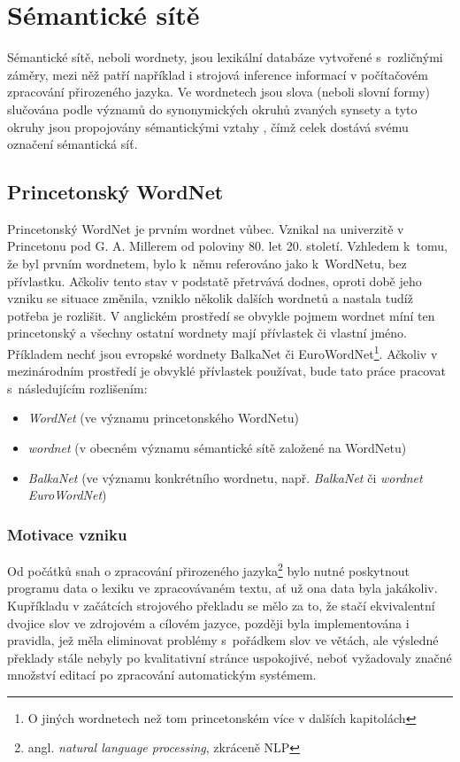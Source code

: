 \documentclass[a4paper, 11pt, oneside, showtrims]{book}
\begin{document}
	\newpage

	\part{Sémantické sítě}
	\label{part:eins}

		Sémantické sítě, neboli wordnety, jsou lexikální databáze vytvořené s~rozličnými záměry, mezi něž patří například i strojová inference informací v počítačovém zpracování přirozeného jazyka. Ve wordnetech jsou slova (neboli slovní formy) slučována podle významů do synonymických okruhů zvaných synsety a tyto okruhy jsou propojovány sémantickými vztahy \parencite{pala2013vceska, princetonWN}, čímž celek dostává svému označení sémantická síť.

		\chapter{Princetonský WordNet} %
		\label{cha:princeton_wn}
		
			Princetonský WordNet je prvním wordnet vůbec. Vznikal na univerzitě v Princetonu pod G. A. Millerem od poloviny 80. let 20. století. Vzhledem k~tomu, že byl prvním wordnetem, bylo k~němu referováno jako k~WordNetu, bez přívlastku. Ačkoliv tento stav v podstatě přetrvává dodnes, oproti době jeho vzniku se situace změnila, vzniklo několik dalších wordnetů a nastala tudíž potřeba je rozlišit. V anglickém prostředí se obvykle pojmem wordnet míní ten princetonský a všechny ostatní wordnety mají přívlastek či vlastní jméno. Příkladem nechť jsou evropské wordnety BalkaNet či EuroWordNet\footnote{O jiných wordnetech než tom princetonském více v dalších kapitolách}. Ačkoliv v mezinárodním prostředí je obvyklé přívlastek  používat, bude tato práce pracovat s~následujícím rozlišením:

			\begin{itemize}
				\item \textit{WordNet} (ve významu princetonského WordNetu)
				\item \textit{wordnet} (v obecném významu sémantické sítě založené na WordNetu)
				\item \textit{BalkaNet} (ve významu konkrétního wordnetu, např. \textit{BalkaNet} či \textit{wordnet EuroWordNet})
			\end{itemize}

			\section{Motivace vzniku}
				Od počátků snah o zpracování přirozeného jazyka\footnote{angl. \textit{natural language processing}, zkráceně NLP} bylo nutné poskytnout programu data o lexiku ve zpracovávaném textu, ať už ona data byla jakákoliv. Kupříkladu v začátcích strojového překladu se mělo za to, že stačí ekvivalentní dvojice slov ve zdrojovém a cílovém jazyce, později byla implementována i pravidla, jež měla eliminovat problémy s~pořádkem slov ve větách, ale výsledné překlady stále nebyly po kvalitativní stránce uspokojivé, neboť vyžadovaly značné množství editací po zpracování automatickým systémem. \parencite{hutchins1982evolution}
\end{document}
